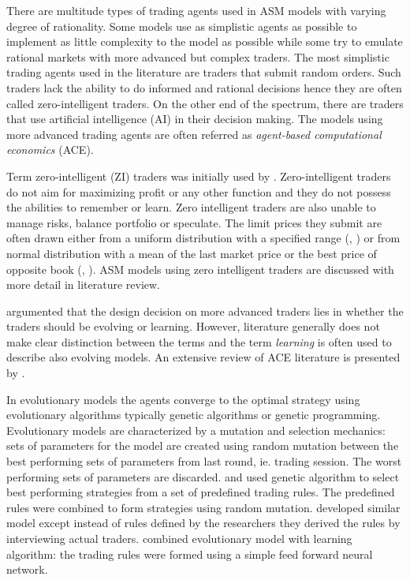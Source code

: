 There are multitude types of trading agents used in ASM models with varying degree
of rationality. Some models use as simplistic agents as possible to implement as
little complexity to the model as possible while some try to emulate rational 
markets with more advanced but complex traders. The most simplistic trading agents
used in the literature are traders that submit random orders. Such traders
lack the ability to do informed and rational decisions hence they are often called
zero-intelligent traders. On the other end of the spectrum, there are traders
that use artificial intelligence (AI) in their decision making. The models using
more advanced trading agents are often referred as \emph{agent-based computational
economics} (ACE).

Term zero-intelligent (ZI) traders was initially used by \citet{God93}. Zero-intelligent
traders do not aim for maximizing profit or any other function and they do not 
possess the abilities to remember or learn. Zero intelligent traders are also unable
to manage risks, balance portfolio or speculate. The limit prices they submit are
often drawn either from a uniform distribution with a specified range (\citet{God93}, \citet{Mil08}) 
or from normal distribution with a mean of the last market price or the
best price of opposite book (\citet{LIU20082535}, \citet{Genoa01}). ASM models using
zero intelligent traders are discussed with more detail in literature review. 

\citet{LeBranon2000} argumented that the design decision on more advanced traders 
lies in whether the traders should be evolving or learning. However, literature
generally does not make clear distinction between the terms and the term \emph{learning}
is often used to describe also evolving models. An extensive review of ACE literature 
is presented by \citet{ACE12}.

In evolutionary models the agents converge to the optimal strategy using evolutionary algorithms typically
genetic algorithms or genetic programming. Evolutionary models are characterized by 
a mutation and selection mechanics: sets of parameters for the model are created 
using random mutation between the best performing sets of parameters from last 
round, ie. trading session. The worst performing sets of parameters are discarded.
\citet{GenAlgASM18} and \citet{GenAlgBTCASM19} used genetic algorithm to select 
best performing strategies from a set of predefined trading rules. The predefined
rules were combined to form strategies using random mutation. \citet{FieldGA05} developed
similar model except instead of rules defined by the researchers they derived the rules 
by interviewing actual traders. \citet{LeBranon2001} combined evolutionary model with 
learning algorithm: the trading rules were formed using a simple feed forward neural network.

